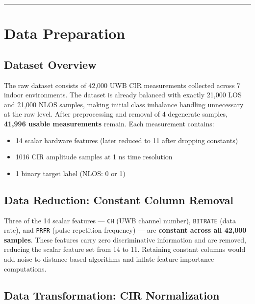 \documentclass[12pt,a4paper]{article}
\newcommand{\passthrough}[1]{#1}
\providecommand{\passthrough}[1]{#1}
\providecommand{\tightlist}{%
  \setlength{\itemsep}{0pt}\setlength{\parskip}{0pt}}
\begin{document}
\begin{center}\rule{0.5\linewidth}{0.5pt}\end{center}

\section{Data Preparation}\label{data-preparation}

\subsection{Dataset Overview}\label{dataset-overview}

The raw dataset consists of 42,000 UWB CIR measurements collected across
7 indoor environments. The dataset is already balanced with exactly
21,000 LOS and 21,000 NLOS samples, making initial class imbalance
handling unnecessary at the raw level. After preprocessing and removal
of 4 degenerate samples, \textbf{41,996 usable measurements} remain.
Each measurement contains:

\begin{itemize}
\tightlist
\item
  14 scalar hardware features (later reduced to 11 after dropping
  constants)
\item
  1016 CIR amplitude samples at 1 ns time resolution
\item
  1 binary target label (NLOS: 0 or 1)
\end{itemize}

\subsection{Data Reduction: Constant Column
Removal}\label{data-reduction-constant-column-removal}

Three of the 14 scalar features --- \passthrough{\lstinline!CH!} (UWB
channel number), \passthrough{\lstinline!BITRATE!} (data rate), and
\passthrough{\lstinline!PRFR!} (pulse repetition frequency) --- are
\textbf{constant across all 42,000 samples}. These features carry zero
discriminative information and are removed, reducing the scalar feature
set from 14 to 11. Retaining constant columns would add noise to
distance-based algorithms and inflate feature importance computations.

\subsection{Data Transformation: CIR
Normalization}\label{data-transformation-cir-normalization}
\end{document}
